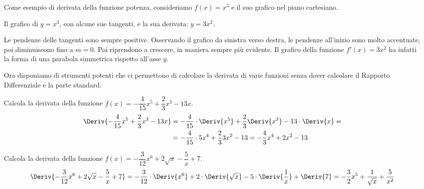\begin{esempio}
Come esempio di derivata della funzione potenza, consideriamo \(f(x)=x^3\)
e il suo grafico nel piano cartesiano. 

\begin{inaccessibleblock}
\hspace{-20mm}
\end{inaccessibleblock}
\label{img:diff_cubica_con_pendenze}
\begin{center} Il grafico di \(y=x^3\), con alcune sue tangenti, e 
la sua derivata: \(y=3x^2\).\end{center}

Le pendenze delle tangenti sono sempre positive. 
Osservando il grafico da sinistra verso destra, le pendenze all'inizio sono 
molto accentuate, poi diminuiscono fino a \(m=0\). 
Poi riprendono a crescere, in maniera sempre più evidente. 
Il grafico della funzione \(f'(x)=3 x^2\) ha infatti la forma di una 
parabola simmetrica rispetto all'asse \(y\).
\end{esempio}

Ora disponiamo di strumenti potenti che 
ci permettono di calcolare la derivata di varie funzioni 
senza dover calcolare il Rapporto Differenziale e la parte standard. 

\begin{esempio}
\label{esem:diff_prodottocostante}
Calcola la derivata della funzione 
\(f(x)=-\dfrac{4}{15}x^5 +\dfrac{2}{3}x^3-13x\).
\begin{align*}
\Deriv{-\dfrac{4}{15}x^5+ \dfrac{2}{3}x^3-13x} &= 
-\dfrac{4}{15} \cdot \Deriv{x^5} + 
 \dfrac{2}{3} \Deriv{x^3} -13 \cdot \Deriv{x}=\\
&=-\dfrac{4}{15} \cdot 5x^4 + \dfrac{2}{3} 3x^2 -13 =
-\dfrac{4}{3} x^4 + 2x^2 -13
\end{align*}
\end{esempio}

\begin{esempio}
\label{esem:diff_prodottocostante}
Calcola la derivata della funzione 
\(f(x)=-\dfrac{3}{12}x^6 +2\sqrt{x} -\dfrac{5}{x} +7\).
\[\Deriv{-\dfrac{3}{12}x^6 +2\sqrt{x} -\dfrac{5}{x} +7} = 
-\dfrac{3}{12} \cdot\Deriv{x^6} +2 \cdot\Deriv{\sqrt{x}} -
 5 \cdot\Deriv{\dfrac{1}{x}} +\Deriv{7}= 
-\dfrac{3}{2} x^5 +\dfrac{1}{\sqrt{x}} +\dfrac{5}{x^2}\]
\end{esempio}

